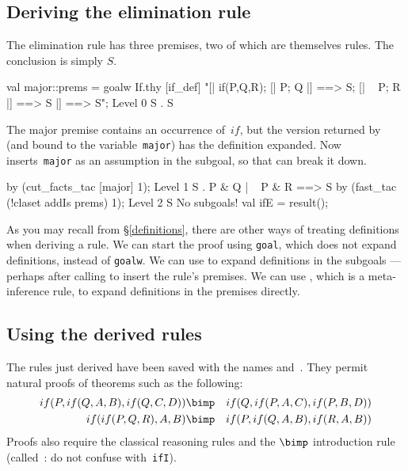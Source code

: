 \subsection{Deriving the elimination rule}
The elimination rule has three premises, two of which are themselves rules.
The conclusion is simply $S$.
\begin{ttbox}
val major::prems = goalw If.thy [if_def]
   "[| if(P,Q,R);  [| P; Q |] ==> S; [| ~ P; R |] ==> S |] ==> S";
{\out Level 0}
{\out S}
{. S}
\end{ttbox}
The major premise contains an occurrence of~$if$, but the version returned
by  (and bound to the {\ML} variable~{\tt major}) has the
definition expanded.  Now  inserts~{\tt major} as an
assumption in the subgoal, so that  can break it down.
\begin{ttbox}
by (cut_facts_tac [major] 1);
{\out Level 1}
{\out S}
{. P & Q | ~ P & R ==> S}
\ttbreak
by (fast_tac (!claset addIs prems) 1);
{\out Level 2}
{\out S}
{\out No subgoals!}
val ifE = result();
\end{ttbox}
As you may recall from
%
        {\S\ref{definitions}}, there are other
ways of treating definitions when deriving a rule.  We can start the
proof using {\tt goal}, which does not expand definitions, instead of
{\tt goalw}.  We can use 
to expand definitions in the subgoals --- perhaps after calling
 to insert the rule's premises.  We can use
, which is a meta-inference rule, to expand
definitions in the premises directly.


\subsection{Using the derived rules}
The rules just derived have been saved with the {\ML} names 
and~.  They permit natural proofs of theorems such as the
following:
\begin{eqnarray*}
    if(P, if(Q,A,B), if(Q,C,D)) & \bimp & if(Q,if(P,A,C),if(P,B,D)) \\
    if(if(P,Q,R), A, B)         & \bimp & if(P,if(Q,A,B),if(R,A,B))
\end{eqnarray*}
Proofs also require the classical reasoning rules and the $\bimp$
introduction rule (called~: do not confuse with~{\tt ifI}). 

